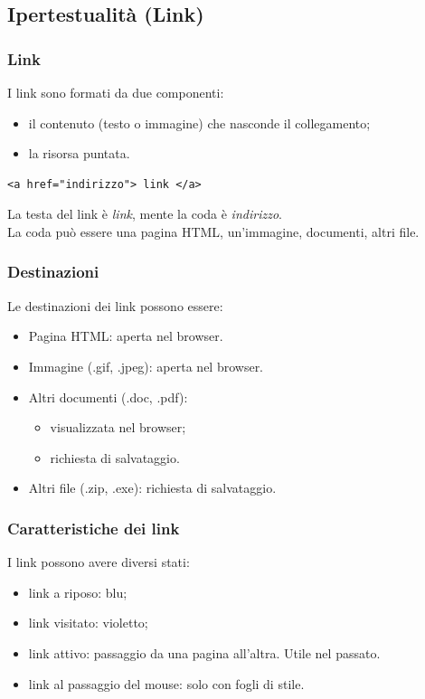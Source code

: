 \documentclass{article}
\begin{document}
\subsection{Ipertestualità (Link)}
\subsubsection{Link}
I link sono formati da due componenti:
\begin{itemize}
    \item il contenuto (testo o immagine) che nasconde il collegamento;
    \item la risorsa puntata.
\end{itemize}
\begin{lstlisting}[style=htmlstyle]
<a href="indirizzo"> link </a>
\end{lstlisting}
La testa del link è \textit{link}, mente la coda è \textit{indirizzo}.
\\ La coda può essere una pagina HTML, un'immagine, documenti, altri file.
\subsubsection{Destinazioni}
Le destinazioni dei link possono essere:
\begin{itemize}
    \item Pagina HTML: aperta nel browser.
    \item Immagine (.gif, .jpeg): aperta nel browser.
    \item Altri documenti (.doc, .pdf):
    \begin{itemize}
        \item visualizzata nel browser;
        \item richiesta di salvataggio.
    \end{itemize}
    \item Altri file (.zip, .exe): richiesta di salvataggio.
\end{itemize}
\subsubsection{Caratteristiche dei link}
I link possono avere diversi stati:
\begin{itemize}
\item link a riposo: \textcolor[HTML]{0000FF}{blu};    
\item link visitato: \textcolor[HTML]{800080}{violetto};
    \item link attivo: passaggio da una pagina all'altra. Utile nel passato.
    \item link al passaggio del mouse: solo con fogli di stile.
\end{itemize}
\end{document}
